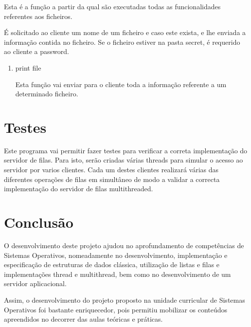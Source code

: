 \documentclass{article}
\begin{document}
Esta é a função a partir da qual são executadas todas as funcionalidades referentes aos ficheiros. \cite{Chapter10}

É solicitado ao cliente um nome de um ficheiro e caso este exista, e lhe enviada a informação contida no ficheiro.
Se o ficheiro estiver na pasta secret, é requerido ao cliente a password.

\begin{enumerate}
\item print file
\label{sec:orgffe26d3}

Esta função vai enviar para o cliente toda a informação referente a um determinado ficheiro.

\pagebreak{}
\end{enumerate}
\section{Testes}
\label{sec:org3820134}

Este programa vai permitir fazer testes para verificar a correta implementação do servidor de filas.
Para isto, serão criadas várias threads para simular o acesso ao servidor por varios clientes. \cite{Chapter9}
Cada um destes clientes realizará várias das diferentes operações de filas em simultâneo de modo a validar a correcta implementação do servidor de filas multithreaded. \cite{Chapter9}

\pagebreak{}
\section{Conclusão}
\label{sec:org24c1a02}

O desenvolvimento deste projeto ajudou no aprofundamento de competências de Sistemas Operativos, nomeadamente no desenvolvimento, implementação e especificação de estruturas de dados clássica, utilização de listas e filas e implementações thread e multithread, bem como no desenvolvimento de um servidor aplicacional.

Assim, o desenvolvimento do projeto proposto na unidade curricular de Sistemas Operativos foi bastante enriquecedor, pois permitiu mobilizar os conteúdos apreendidos no decorrer das aulas teóricas e práticas.

\pagebreak{}


\end{document}
